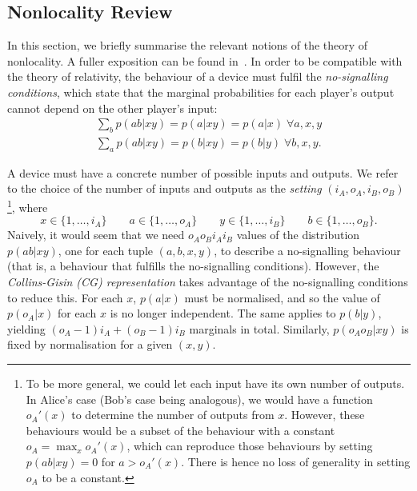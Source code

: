 \documentclass[10pt, a4paper]{article}
\numberwithin{equation}{section} %
\theoremstyle{definition}
\theoremstyle{plain}
\newcommand{\dintv}[2]{\mathopen\{#1,\ldots,#2\mathclose\}}
\newcommand{\?}{\mathrel{?}} %
\begin{document}
  \subsection{Nonlocality Review}\label{sec:pre_nl}

  In this section, we briefly summarise the relevant notions of the theory of nonlocality. A fuller exposition can be found in~\cite{BellNonlocality}. In order to be compatible with the theory of relativity, the behaviour of a device must fulfil the \emph{no-signalling conditions}, which state that the marginal probabilities for each player's output cannot depend on the other player's input:
  \begin{gather}
    \sum_b p(ab|xy) = p(a|xy) = p(a|x)\;\forall a,x,y \\
    \sum_a p(ab|xy) = p(b|xy) = p(b|y)\;\forall b,x,y.
  \end{gather}

  A device must have a concrete number of possible inputs and outputs. We refer to the choice of the number of inputs and outputs as the \emph{setting} \((i_A, o_A, i_B, o_B)\)\footnote{To be more general, we could let each input have its own number of outputs. In Alice's case (Bob's case being analogous), we would have a function \(o_A'(x)\) to determine the number of outputs from \(x\). However, these behaviours would be a subset of the behaviour with a constant \(o_A = \max_x o_A'(x)\), which can reproduce those behaviours by setting \(p(ab|xy) = 0\) for \(a > o_A'(x)\). There is hence no loss of generality in setting \(o_A\) to be a constant.}, where
  \[ x \in \dintv{1}{i_A} \qquad a \in \dintv{1}{o_A} \qquad y \in \dintv{1}{i_B} \qquad b \in \dintv{1}{o_B}. \]
  Naively, it would seem that we need \(o_A o_B i_A i_B\) values of the distribution \(p(ab|xy)\), one for each tuple \((a, b, x, y)\), to describe a no-signalling behaviour (that is, a behaviour that fulfills the no-signalling conditions). However, the \emph{Collins-Gisin (CG) representation} takes advantage of the no-signalling conditions to reduce this. For each \(x\), \(p(a|x)\) must be normalised, and so the value of \(p(o_A|x)\) for each \(x\) is no longer independent. The same applies to \(p(b|y)\), yielding \((o_A-1)i_A + (o_B-1)i_B\) marginals in total. Similarly, \(p(o_A o_B|xy)\) is fixed by normalisation for a given \((x,y)\).
\end{document}
